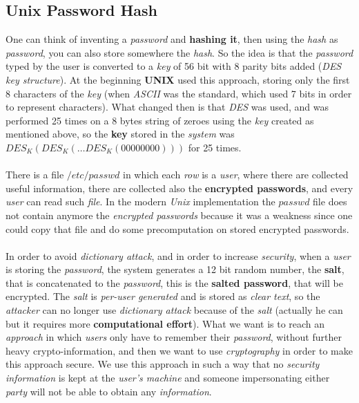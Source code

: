 \documentclass{article}
\begin{document}
\subsection{Unix Password Hash}
One can think of inventing a \emph{password} and \textbf{hashing it}, then using the \emph{hash} as \emph{password}, you can also store somewhere the \emph{hash}. So the idea is that the \emph{password} typed by the user is converted to a \emph{key} of 56 bit with 8 parity bits added (\emph{DES key structure}). At the beginning \textbf{UNIX} used this approach, storing only the first 8 characters of the \emph{key} (when \emph{ASCII} was the standard, which used 7 bits in order to represent characters). What changed then is that \emph{DES} was used, and was performed 25 times on a 8 bytes string of zeroes using the \emph{key} created as mentioned above, so the \textbf{key} stored in the \emph{system} was $DES_K(DES_K(…DES_K(00000000)))$ for 25 times. \\\\
There is a file $/etc/passwd$ in which each \emph{row} is a \emph{user}, where there are collected useful information, there are collected also the \textbf{encrypted passwords}, and every \emph{user} can read such \emph{file}. In the modern \emph{Unix} implementation the $passwd$ file does not contain anymore the \emph{encrypted passwords} because it was a weakness since one could copy that file and do some precomputation on stored encrypted passwords.\\\\
In order to avoid \emph{dictionary attack}, and in order to increase \emph{security}, when a \emph{user} is storing the \emph{password}, the system generates a 12 bit random number, the \textbf{salt}, that is concatenated to the \emph{password}, this is the \textbf{salted password}, that will be encrypted. The \emph{salt} is \emph{per-user generated} and is stored as \emph{clear text}, so the \emph{attacker} can no longer use \emph{dictionary attack} because of the \emph{salt} (actually he can but it requires more \textbf{computational effort}). What we want is to reach an \emph{approach} in which \emph{users} only have to remember their \emph{password}, without further heavy crypto-information, and then we want to use \emph{cryptography} in order to make this approach secure. We use this approach in such a way that no \emph{security information} is kept at the \emph{user's machine} and someone impersonating either \emph{party} will not be able to obtain any \emph{information}.
\clearpage
\end{document}

